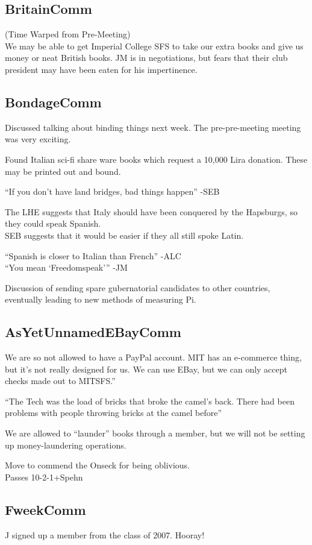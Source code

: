 \documentclass[10pt]{article}
\begin{document}
\subsection*{BritainComm}
(Time Warped from Pre-Meeting)\\
We may be able to get Imperial College SFS to take our extra books and
give us money or neat British books.  JM is in negotiations, but fears
that their club president may have been eaten for his impertinence.

\subsection*{BondageComm}
Discussed talking about binding things next week.
The pre-pre-meeting meeting was very exciting.

Found Italian sci-fi share ware books which request a 10,000 Lira
donation.  These may be printed out and bound.

``If you don't have land bridges, bad things happen'' -SEB

The LHE suggests that Italy should have been conquered by the
Hapsburgs, so they could speak Spanish.\\
SEB suggests that it would be easier if they all still spoke Latin.

``Spanish is closer to Italian than French'' -ALC\\
``You mean `Freedomspeak''' -JM

Discussion of sending spare gubernatorial candidates to other
countries, eventually leading to new methods of measuring Pi.

\subsection*{AsYetUnnamedEBayComm}
We are so not allowed to have a PayPal account.  MIT has an e-commerce
thing, but it's not really designed for us.  We can use EBay, but we
can only accept checks made out to MITSFS.''

``The Tech was the load of bricks that broke the camel's back.  There
had been problems with people throwing bricks at the camel before''

We are allowed to ``launder'' books through a member, but we will not
be setting up money-laundering operations.

Move to commend the Onseck for being oblivious.\\
Passes 10-2-1+Spehn

\subsection*{FweekComm }
J signed up a member from the class of 2007. Hooray!
\end{document}
